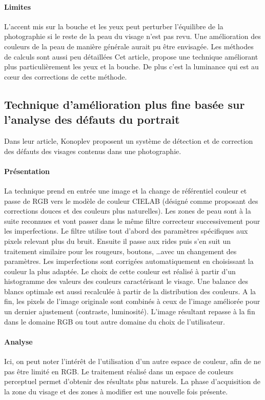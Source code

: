 \documentclass[11pt, french]{report-rd-info}
\begin{document}
\paragraph{Limites}
L’accent mis sur la bouche et les yeux peut perturber l’équilibre de la photographie si le reste de la peau du visage n’est pas revu. Une amélioration des couleurs de la peau de manière générale aurait pu être envisagée. Les méthodes de calculs sont aussi peu détaillées
Cet article, propose une technique améliorant plus particulièrement les yeux et la bouche. De plus c’est la luminance qui est au cœur des corrections de cette méthode.
\subsection{Technique d’amélioration plus fine basée sur l’analyse des défauts du portrait}
Dans leur article, Konoplev\cite{Konoplev2012} proposent un système de détection et de correction des défauts des visages contenus dans une photographie.
\paragraph{Présentation}
La technique prend en entrée une image et la change de référentiel couleur et passe de RGB vers le modèle de couleur CIELAB (désigné comme proposant des corrections douces et des couleurs plus naturelles). Les zones de peau sont à la suite reconnues et vont passer dans le même filtre correcteur successivement pour les imperfections. Le filtre utilise tout d'abord des paramètres spécifiques aux pixels relevant plus du bruit. Ensuite il passe aux rides puis s'en suit un traitement similaire pour les rougeurs, boutons, \ldots avec un changement des paramètres. Les imperfections sont corrigées automatiquement en choisissant la couleur la plus adaptée. Le choix de cette couleur est réalisé à partir d’un histogramme des valeurs des couleurs caractérisant le visage. Une balance des blancs optimale est aussi recalculée à partir de la distribution des couleurs. A la fin, les pixels de l’image originale sont combinés à ceux de l’image améliorée pour un dernier ajustement (contraste, luminosité). L'image résultant repasse à la fin dans le domaine RGB ou tout autre domaine du choix de l’utilisateur.
\paragraph{Analyse}
Ici, on peut noter l'intérêt de l'utilisation d'un autre espace de couleur, afin de ne pas être limité en RGB. Le traitement réalisé dans un espace de couleurs perceptuel permet d'obtenir des résultats plus naturels. La phase d'acquisition de la zone du visage et des zones à modifier est une nouvelle fois présente.
\end{document}
